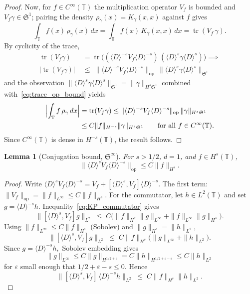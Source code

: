 \documentclass[11pt]{amsart}
\newtheorem{lemma}[theorem]{Lemma}
\theoremstyle{definition}
\newcommand{\T}{\mathbb{T}}
\newcommand{\Sp}{\mathfrak{S}}
\DeclareMathOperator{\tr}{tr}
\begin{document}
\begin{proof}
Now, for $f\in C^\infty(\T)$ the multiplication operator $V_f$ is bounded and $V_f\gamma\in\Sp^1$; pairing the density $\rho_\gamma(x)=K_\gamma(x,x)$ against $f$ gives
\[
  \int_\T f(x)\,\rho_\gamma(x)\,dx
  = \int_\T f(x)\,K_\gamma(x,x)\,dx
  = \tr(V_f\,\gamma).
\]
By cyclicity of the trace,
\[
\begin{aligned}
  \tr(V_f\gamma)
  &= \tr\bigl((\langle D\rangle^{-s}V_f\langle D\rangle^{-s})\,
  (\langle D\rangle^s\gamma\langle D\rangle^s)\bigr) \implies \\
    |\tr(V_f\gamma)|\;&\le\;\|\langle D\rangle^{-s}V_f\langle D\rangle^{-s}\|_{\mathrm{op}}\,\|\langle D\rangle^s\gamma\langle D\rangle^s\|_{\Sp^1}
\end{aligned}
\]
and the observation $\|\langle D\rangle^s\gamma\langle D\rangle^s\|_{\Sp^1}=\|\gamma\|_{H^s\Sp^1}$
combined with~\eqref{eq:trace_op_bound} yields
\begin{align*}
\Bigl|\int_\T f\,\rho_\gamma\,dx\Bigr|&=  \tr(V_f\gamma)
  \le \|\langle D\rangle^{-s}V_f\langle D\rangle^{-s}\|_{\mathrm{op}}\,
  \|\gamma\|_{H^s\Sp^1}\\
  &\le C\|f\|_{H^{-s}}\|\gamma\|_{H^s\Sp^1}
  \qquad\text{for all }f\in C^\infty(\T).
\end{align*}
Since $C^\infty(\T)$ is dense in $H^{-s}(\T)$, the result follows.
\end{proof}

\begin{lemma}[Conjugation bound, $\Sp^\infty$]\label{lem:conj}
For $s>1/2$, $d=1$, and $f\in H^s(\T)$,
\begin{equation}\label{eq:conj}
  \|\langle D\rangle^s V_f
  \langle D\rangle^{-s}\|_{\mathrm{op}}
  \le C\|f\|_{H^s}.
\end{equation}
\end{lemma}

\begin{proof}
Write $\langle D\rangle^s V_f \langle D\rangle^{-s} = V_f + [\langle D\rangle^s,V_f] \langle D\rangle^{-s}$. The first term: $\|V_f\|_{\mathrm{op}}=\|f\|_{L^\infty} \le C\|f\|_{H^s}.$ For the commutator, let $h\in L^2(\T)$ and set $g=\langle D\rangle^{-s}h.$ Inequality~\eqref{eq:KP_commutator} gives
\[
  \|[\langle D\rangle^s,V_f]g\|_{L^2}
  \;\le\; C\bigl(\|f\|_{H^s}\|g\|_{L^\infty}+\|f\|_{L^\infty}\|g\|_{H^s}\bigr).
\]
Using $\|f\|_{L^\infty}\le C\|f\|_{H^s}$ (Sobolev) and $\|g\|_{H^s}=\|h\|_{L^2},$
\[
  \|[\langle D\rangle^s,V_f]g\|_{L^2}
  \;\le\; C\|f\|_{H^s}\bigl(\|g\|_{L^\infty}+\|h\|_{L^2}\bigr).
\]
Since $g=\langle D\rangle^{-s}h,$ Sobolev embedding gives 
\[
\|g\|_{L^\infty}\le C\|g\|_{H^{1/2+\varepsilon}} = C\|h\|_{H^{1/2+\varepsilon-s}}\le C\|h\|_{L^2}
\]
 for $\varepsilon$ small enough that $1/2+\varepsilon-s\le 0.$ Hence
\[
  \|[\langle D\rangle^s,V_f]\,\langle D\rangle^{-s}h\|_{L^2}
  \;\le\; C\|f\|_{H^s}\|h\|_{L^2}.
\]
\end{proof}
\end{document}
